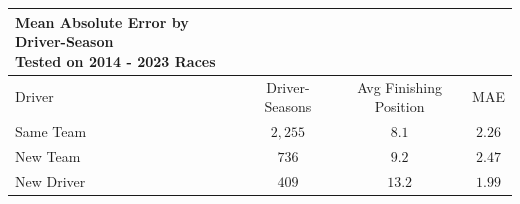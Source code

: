 \begin{longtable}{lccc}
\caption*{
{\large \textbf{Mean Absolute Error by Driver-Season}} \\ 
{\small Tested on 2014 - 2023 Races}
} \\ 
\toprule
Driver & Driver-Seasons & Avg Finishing Position & MAE \\ 
\midrule\addlinespace[2.5pt]
Same Team & $2,255$ & $8.1$ & $2.26$ \\ 
New Team & $736$ & $9.2$ & $2.47$ \\ 
New Driver & $409$ & $13.2$ & $1.99$ \\ 
\bottomrule
\end{longtable}


